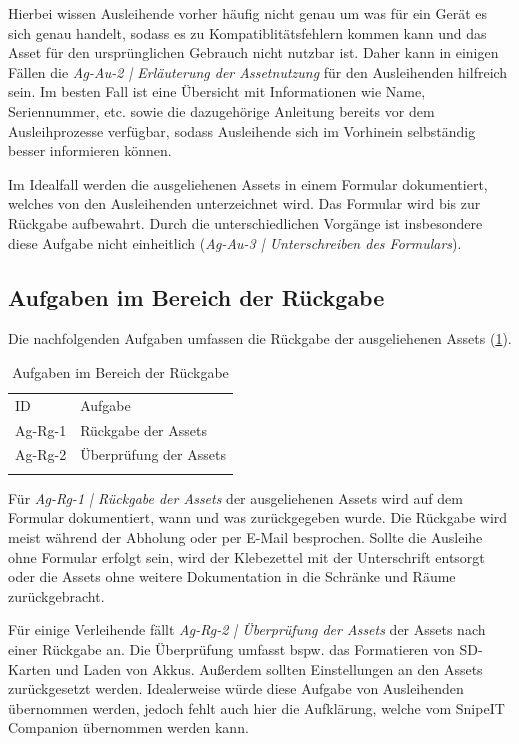Hierbei wissen Ausleihende vorher häufig nicht genau um was für ein Gerät es sich genau handelt,
sodass es zu Kompatiblitätsfehlern kommen kann und das Asset für den ursprünglichen Gebrauch nicht
nutzbar ist. Daher kann in einigen Fällen die \textit{Ag-Au-2 | Erläuterung der Assetnutzung} für
den Ausleihenden hilfreich sein. Im besten Fall ist eine Übersicht mit Informationen wie Name,
Seriennummer, etc. sowie die dazugehörige Anleitung bereits vor dem Ausleihprozesse verfügbar,
sodass Ausleihende sich im Vorhinein selbständig besser informieren können.

Im Idealfall werden die ausgeliehenen Assets in einem Formular dokumentiert, welches von den
Ausleihenden unterzeichnet wird. Das Formular wird bis zur Rückgabe aufbewahrt. Durch die
unterschiedlichen Vorgänge ist insbesondere diese Aufgabe nicht einheitlich (\textit{Ag-Au-3
| Unterschreiben des Formulars}).

\subsection{Aufgaben im Bereich der Rückgabe}
Die nachfolgenden Aufgaben umfassen die Rückgabe der ausgeliehenen Assets (\ref{table:Ag-Rg}).
\begin{table}[h]
        \centering
        \caption{Aufgaben im Bereich der Rückgabe}
        \begin{tabular}{ll}
                \arrayrulecolor{maincolor}\hline
                \sffamily\color{maincolor}ID & \sffamily\color{maincolor}Aufgabe \\
                \arrayrulecolor{maincolor}\hline
                Ag-Rg-1                      & Rückgabe der Assets \\
                Ag-Rg-2                      & Überprüfung der Assets \\
                \arrayrulecolor{maincolor}\hline
        \end{tabular}
        \label{table:Ag-Rg}
\end{table}

Für \textit{Ag-Rg-1 | Rückgabe der Assets} der ausgeliehenen Assets wird auf dem Formular dokumentiert, wann
und was zurückgegeben wurde. Die Rückgabe wird meist während der Abholung oder per E-Mail
besprochen. Sollte die Ausleihe ohne Formular erfolgt sein, wird der Klebezettel mit der
Unterschrift entsorgt oder die Assets ohne weitere Dokumentation in die Schränke und Räume
zurückgebracht.

Für einige Verleihende fällt \textit{Ag-Rg-2 | Überprüfung der Assets} der Assets nach einer Rückgabe an. Die
Überprüfung umfasst bspw. das Formatieren von SD-Karten und Laden von Akkus. Außerdem sollten
Einstellungen an den Assets zurückgesetzt werden. Idealerweise würde diese Aufgabe von Ausleihenden
übernommen werden, jedoch fehlt auch hier die Aufklärung, welche vom SnipeIT Companion übernommen
werden kann.
